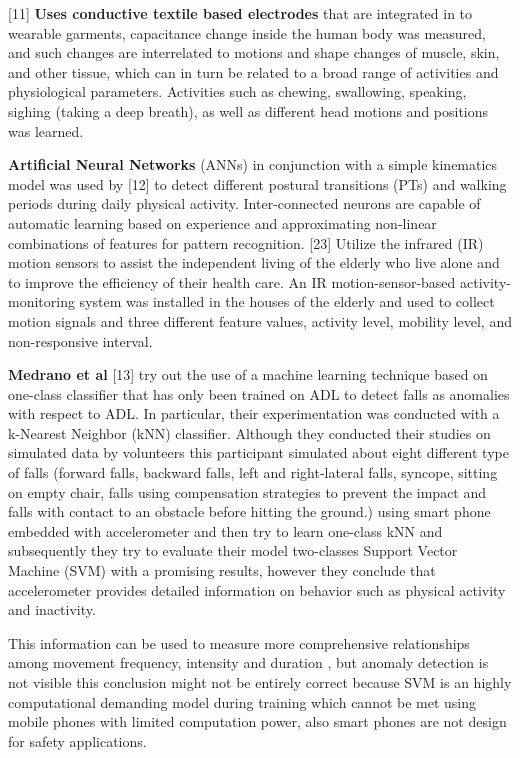 \documentclass[a4paper, parskip=full]{scrartcl}
\begin{document}
[11] \textbf{Uses conductive textile based electrodes} that are integrated in to wearable garments, capacitance change inside the human body was measured, and such changes are interrelated to motions and shape changes of muscle, skin, and other tissue, which can in turn be related to a broad range of activities and physiological parameters. Activities such as chewing, swallowing, speaking, sighing (taking a deep breath), as well as different head motions and positions was learned.

\textbf{Artificial Neural Networks} (ANNs) in conjunction with a simple kinematics model was used by [12] to detect different postural transitions (PTs) and walking periods during daily physical activity.  Inter-connected neurons are capable of automatic learning based on experience and approximating non-linear combinations of features for pattern recognition. [23] Utilize the infrared (IR) motion sensors to assist the independent living of the elderly who live alone and to improve the efficiency of their health care. An IR motion-sensor-based activity-monitoring system was installed in the houses of the elderly and used to collect motion signals and three different feature values, activity level, mobility level, and non-responsive interval.


\textbf{Medrano et al} [13] try out the use of a machine learning technique based on one-class classifier that has only been trained on ADL to detect falls as anomalies with respect to ADL. In particular, their experimentation was conducted with a k-Nearest Neighbor (kNN) classifier. Although they conducted their studies on simulated data by volunteers this participant simulated about eight different type of falls (forward falls, backward falls, left and right-lateral falls, syncope, sitting on empty chair, falls using compensation strategies to prevent the impact and falls with contact to an obstacle before hitting the ground.) using smart phone embedded with accelerometer and then try to learn one-class kNN and subsequently they try to evaluate their model two-classes Support Vector Machine (SVM) with a promising results, however they conclude that accelerometer provides detailed information on behavior such as physical activity and inactivity. 

This information can be used to measure more comprehensive relationships among movement frequency, intensity and duration , but anomaly detection is not visible this conclusion might not be entirely correct because SVM is an highly computational demanding model during training which cannot be met using mobile phones with limited computation power, also smart phones are not design for safety applications.
\end{document}
